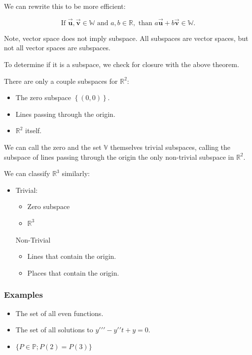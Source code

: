 \documentclass[12pt, landscape, twocolumn]{article}
\let\oldvec\vec
\renewcommand{\vec}[1]{\oldvec{\mathbf{ #1 } } }                    %
\begin{document}
    We can rewrite this to be more efficient:

    \begin{equation}\label{eq:subspace_closure}
        \text{If } \vec{u}, \vec{v} \in \mathbb{W} \text{ and } a, b \in \mathbb{R}, \text{ than } a\vec{u} + b\vec{v} \in \mathbb{W}.
    \end{equation}

    Note, vector space does not imply subspace. All subspaces are vector spaces, but not all vector spaces are subspaces.

    To determine if it is a subspace, we check for closure with the above theorem.

    There are only a couple subspaces for $\mathbb{R}^2$:
    \begin{itemize}
        \item The zero subspace $\left\{ (0, 0) \right\}$.
        \item Lines passing through the origin.
        \item $\mathbb{R}^2$ itself.
    \end{itemize}

    We can call the zero and the set $\mathbb{V}$ themselves trivial subspaces, calling the subspace of lines passing through the origin the only non-trivial subspace in $\mathbb{R}^2$.

    We can classify $\mathbb{R}^3$ similarly:
    \begin{itemize}
    \item Trivial:
        \begin{itemize}
        \item Zero subspace
        \item $\mathbb{R}^3$
        \end{itemize}
    Non-Trivial
        \begin{itemize}
        \item Lines that contain the origin.
        \item Places that contain the origin.
        \end{itemize}
    \end{itemize}

        \subsubsection{Examples}
        \begin{itemize}
        \item The set of all even functions.
        \item The set of all solutions to $y\prime\prime\prime - y\prime\prime t + y = 0$.
        \item $\{P \in \mathbb{P}; P(2) = P(3)\}$
        \end{itemize}
\end{document}
